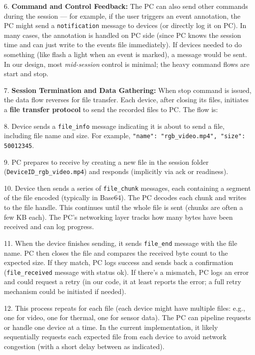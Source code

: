 \documentclass[11pt,a4paper]{report}
\begin{document}
6.  \textbf{Command and Control Feedback:} The PC can also send other
    commands during the session --- for example, if the user triggers an
    event annotation, the PC might send a \texttt{notification} message to
    devices (or directly log it on PC). In many cases, the annotation is
    handled on PC side (since PC knows the session time and can just
    write to the events file immediately). If devices needed to do
    something (like flash a light when an event is marked), a message
    would be sent. In our design, most \textit{mid-session} control is minimal;
    the heavy command flows are start and stop.

7.  \textbf{Session Termination and Data Gathering:} When stop command is
    issued, the data flow reverses for file transfer. Each device, after
    closing its files, initiates a \textbf{file transfer protocol} to send
    the recorded files to PC. The flow is:

8.  Device sends a \texttt{file\_info} message indicating it is about to send a
    file, including file name and
    size.
    For example, \texttt{"name": "rgb\_video.mp4", "size": 50012345}.

9.  PC prepares to receive by creating a new file in the session folder
    (\texttt{DeviceID\_rgb\_video.mp4}) and responds (implicitly via ack or
    readiness).

10. Device then sends a series of \texttt{file\_chunk} messages, each containing
    a segment of the file encoded (typically in
    Base64).
    The PC decodes each chunk and writes to the file
    handle.
    This continues until the whole file is sent (chunks are often a few
    KB each). The PC's networking layer tracks how many bytes have been
    received and can log
    progress.

11. When the device finishes sending, it sends \texttt{file\_end} message with
    the file
    name.
    PC then closes the file and compares the received byte count to the
    expected
    size.
    If they match, PC logs success and sends back a confirmation
    (\texttt{file\_received} message with status
    ok).
    If there's a mismatch, PC logs an error and could request a retry
    (in our code, it at least reports the error; a full retry mechanism
    could be initiated if needed).

12. This process repeats for each file (each device might have multiple
    files: e.g., one for video, one for thermal, one for sensor data).
    The PC can pipeline requests or handle one device at a time. In the
    current implementation, it likely sequentially requests each
    expected file from each
    device
    to avoid network congestion (with a short delay between as
    indicated).
\end{document}
